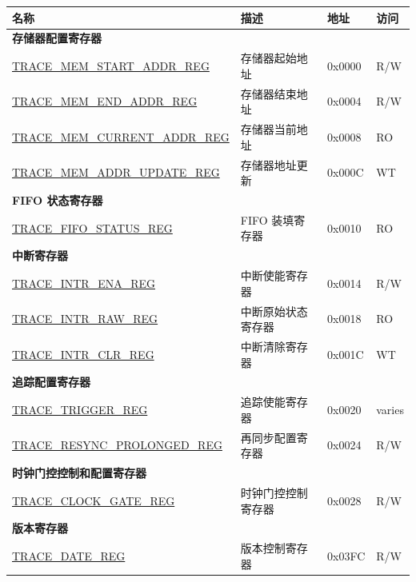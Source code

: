 \begin{longtable}{ | p{6cm} | p{7.2cm} | p{1.3cm} | p{1cm} | }
\hline\rowcolor{lightgray}
\textbf{名称} & \textbf{描述} &  \textbf{地址} & \textbf{访问} \\ \hline
\endhead
\multicolumn{4}{|l|}{\textbf{存储器配置寄存器}} \\ \hline
\hyperref[regdesc:TRACEMEMSTARTADDRREG]{TRACE\_MEM\_START\_ADDR\_REG} & 存储器起始地址 & 0x0000 & R/W \\ \hline
\hyperref[regdesc:TRACEMEMENDADDRREG]{TRACE\_MEM\_END\_ADDR\_REG} & 存储器结束地址 & 0x0004 & R/W \\ \hline
\hyperref[regdesc:TRACEMEMCURRENTADDRREG]{TRACE\_MEM\_CURRENT\_ADDR\_REG} & 存储器当前地址 & 0x0008 & RO \\ \hline
\hyperref[regdesc:TRACEMEMADDRUPDATEREG]{TRACE\_MEM\_ADDR\_UPDATE\_REG} & 存储器地址更新 & 0x000C & WT \\ \hline
\multicolumn{4}{|l|}{\textbf{FIFO 状态寄存器}} \\ \hline
\hyperref[regdesc:TRACEFIFOSTATUSREG]{TRACE\_FIFO\_STATUS\_REG} & FIFO 装填寄存器 & 0x0010 & RO \\ \hline
\multicolumn{4}{|l|}{\textbf{中断寄存器}} \\ \hline
\hyperref[regdesc:TRACEINTRENAREG]{TRACE\_INTR\_ENA\_REG} & 中断使能寄存器 & 0x0014 & R/W \\ \hline
\hyperref[regdesc:TRACEINTRRAWREG]{TRACE\_INTR\_RAW\_REG} & 中断原始状态寄存器 & 0x0018 & RO \\ \hline
\hyperref[regdesc:TRACEINTRCLRREG]{TRACE\_INTR\_CLR\_REG} & 中断清除寄存器 & 0x001C & WT \\ \hline
\multicolumn{4}{|l|}{\textbf{追踪配置寄存器}} \\ \hline
\hyperref[regdesc:TRACETRIGGERREG]{TRACE\_TRIGGER\_REG} & 追踪使能寄存器 & 0x0020 & varies \\ \hline
\hyperref[regdesc:TRACERESYNCPROLONGEDREG]{TRACE\_RESYNC\_PROLONGED\_REG} & 再同步配置寄存器 & 0x0024 & R/W \\ \hline
\multicolumn{4}{|l|}{\textbf{时钟门控控制和配置寄存器}} \\ \hline
\hyperref[regdesc:TRACECLOCKGATEREG]{TRACE\_CLOCK\_GATE\_REG} & 时钟门控控制寄存器 & 0x0028 & R/W \\ \hline
\multicolumn{4}{|l|}{\textbf{版本寄存器}} \\ \hline
\hyperref[regdesc:TRACEDATEREG]{TRACE\_DATE\_REG} & 版本控制寄存器 & 0x03FC & R/W \\ \hline
\end{longtable}
